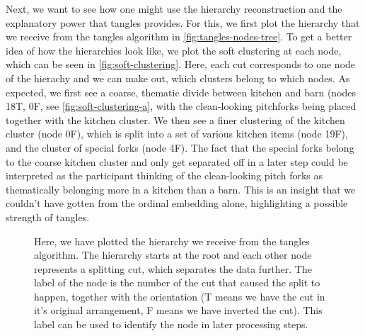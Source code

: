 Next, we want to see how one might use the hierarchy reconstruction and the explanatory power that tangles provides. For this, we first plot the hierarchy that we receive from the tangles
algorithm in \autoref{fig:tangles-nodes-tree}. To get a better idea of how the hierarchies look like, we plot the soft clustering at each node, which
can be seen in \autoref{fig:soft-clustering}. Here, each cut corresponds to one node of the hierachy and we can make out, which
clusters belong to which nodes. As expected, we first see a coarse, thematic divide between kitchen and barn (nodes 18T, 0F, see \autoref{fig:soft-clustering-a}, with 
the clean-looking pitchforks being placed together with the kitchen cluster. 
We then see a finer clustering of the kitchen cluster (node 0F), which is split into a set of various kitchen items (node 19F), and the cluster of special forks (node 4F). 
The fact that the special forks belong to the coarse kitchen cluster and only get separated off in a later step could be interpreted as the participant thinking of the 
clean-looking pitch forks as thematically belonging more in a kitchen than a barn. This is an insight that we couldn't have gotten from the ordinal embedding alone,
highlighting a possible strength of tangles.


\onecolumn
\begin{figure}[ht]
    \centering
    \caption{
        Here, we have plotted the hierarchy we receive from the tangles algorithm. The hierarchy starts at the root and each other node represents a splitting cut, which
        separates the data further.  The label of the node is the number of the cut that caused the split to happen, together with the orientation (T means we have the cut in
        it's original arrangement, F means we have inverted the cut). This label can be used to identify the node in later processing steps.
    }
    \label{fig:tangles-nodes-tree}
\end{figure}


